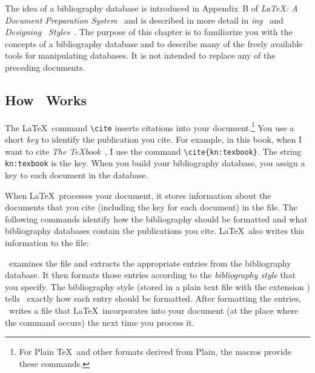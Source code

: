 The idea of a bibliography database is introduced in Appendix~B of
\textit{\LaTeX: A Document Preparation System}~\cite{ll:latexbook} and
is described in more detail in \textit{\BibTeX{}ing}~\cite{op:btxdoc} 
and \textit{Designing \BibTeX\ Styles}~\cite{op:btxhak}.  
The purpose of this chapter is to
familiarize you with the concepts of a bibliography database and to describe
many of the freely available tools for manipulating databases.  It is
not intended to replace any of the preceding documents.

\subsection{How \protect\BibTeX\ Works}

The \LaTeX\ command \verb|\cite| inserts 
citations into your
document.\footnote{For Plain \TeX\ and other formats derived from Plain,
the  macros provide these commands.}  
You use a short \textit{key} to 
identify the publication
you cite.  For example, in this book, when I want to
cite \textit{The \TeX{}book}~\cite{kn:texbook}, I use the command
\verb|\cite{kn:texbook}|.  The string \verb|kn:texbook| is the
key.  When you build your bibliography database, you assign a key
to each document in the database.  

When \LaTeX\ processes your document, it stores information about the
documents that you cite (including the key for each document) in
the  file.  The following commands
identify how the bibliography should be formatted and what bibliography
databases contain the publications you cite.  \LaTeX\ also
writes this information to the  file:

\begin{shortexample}


\end{shortexample}

\BibTeX\ examines the  file and extracts
the appropriate entries from the bibliography database.  It then formats
those entries according to the {\em bibliography style\/} that you specify.
The bibliography style (stored in a plain text file with the extension
) tells \BibTeX\ exactly 
how each entry should be formatted.
After formatting the entries, \BibTeX\ writes 
a  file that
\LaTeX\ incorporates into your document (at the place where the 
\verb|| command occurs) the next time 
you process it.

